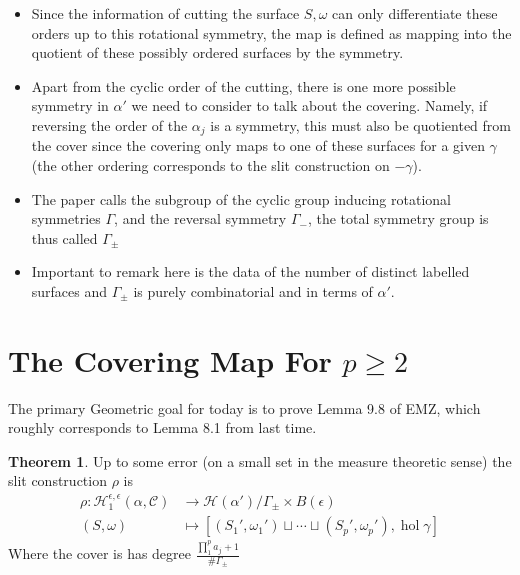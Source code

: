 \documentclass[20pt]{article}
\theoremstyle{definition}
\newtheorem{thm}{Theorem}[section]
\newcommand{\hol}{\operatorname{hol}}
\begin{document}
\begin{itemize}
        \item Since the information of cutting the surface \(S,\omega\) can only differentiate these orders up to this rotational symmetry, the map is defined as mapping into the quotient of these possibly ordered surfaces by the symmetry.
        \item Apart from the cyclic order of the cutting, there is one more possible symmetry in \(\alpha'\) we need to consider to talk about the covering. Namely, if reversing the order of the \(\alpha_j\) is a symmetry, this must also be quotiented from the cover since the covering only maps to one of these surfaces for a given \(\gamma\) (the other ordering corresponds to the slit construction on \(-\gamma\)).
        \item The paper calls the subgroup of the cyclic group inducing rotational symmetries \(\Gamma\), and the reversal symmetry \(\Gamma_{-}\), the total symmetry group is thus called \(\Gamma_{\pm}\)
        \item Important to remark here is the data of the number of distinct labelled surfaces and \(\Gamma_\pm\) is purely combinatorial and in terms of \(\alpha'\).
    \end{itemize}

    \section{The Covering Map For \(p \geq 2\)}

    The primary Geometric goal for today is to prove Lemma 9.8 of EMZ, which roughly corresponds to Lemma 8.1 from last time.

    \begin{thm}
        Up to some error (on a small set in the measure theoretic sense) the slit construction \(\rho\) is
        \begin{align*}
            \rho: \mathcal{H}_1^{\epsilon, \epsilon}(\alpha, \mathcal{C}) &\to \mathcal{H}(\alpha')/\Gamma_{\pm} \times B(\epsilon) \\
            (S,\omega) &\mapsto \left[(S_1',\omega_1') \sqcup \cdots \sqcup (S_p',\omega_p'), \hol\gamma\right]
        \end{align*}
        Where the cover is has degree \(\frac{\prod_1^p a_j + 1}{\#\Gamma_\pm}\)
    \end{thm}
\end{document}
